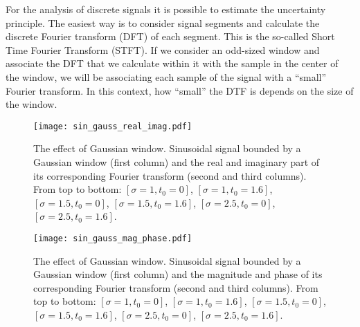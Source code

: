For the analysis of discrete signals it is possible to estimate the uncertainty principle. The easiest way is to consider signal segments and calculate the discrete Fourier transform (DFT) of each segment. This is the so-called Short Time Fourier Transform (STFT). If we consider an odd-sized window and associate the DFT that we calculate within it with the sample in the center of the window, we will be associating each sample of the signal with a ``small'' Fourier transform. In this context, how ``small'' the DTF is depends on the size of the window.



\begin{figure}
\centering
\texttt{[image: sin\_gauss\_real\_imag.pdf]}
\caption{The effect of Gaussian window. Sinusoidal signal bounded by a Gaussian window (first column) and the real and imaginary part of its corresponding Fourier transform (second and third columns). From top to bottom: $[\sigma=1, t_0=0]$, $[\sigma=1, t_0=1.6]$, $[\sigma=1.5, t_0=0]$, $[\sigma=1.5, t_0=1.6]$, $[\sigma=2.5, t_0=0]$, $[\sigma=2.5, t_0=1.6]$.}\label{fig:gaussian_window_real_imag}
\end{figure}

\begin{figure}
\centering
\texttt{[image: sin\_gauss\_mag\_phase.pdf]}
\caption{The effect of Gaussian window. Sinusoidal signal bounded by a Gaussian window (first column) and the magnitude and phase of its corresponding Fourier transform (second and third columns). From top to bottom: $[\sigma=1, t_0=0]$, $[\sigma=1, t_0=1.6]$, $[\sigma=1.5, t_0=0]$, $[\sigma=1.5, t_0=1.6]$, $[\sigma=2.5, t_0=0]$, $[\sigma=2.5, t_0=1.6]$.}\label{fig:gaussian_window_mag_phase}
\end{figure}






